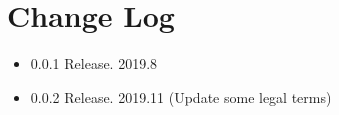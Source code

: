 \section{Change Log}
\begin{itemize}
\item{0.0.1} Release. 2019.8
\item{0.0.2} Release. 2019.11 (Update some legal terms)
\end{itemize}
